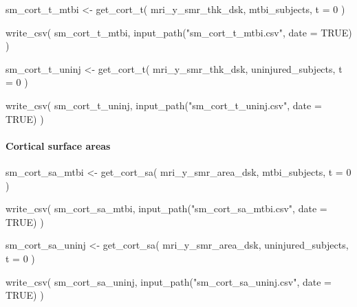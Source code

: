 \documentclass[
  letterpaper,
  DIV=11,
  numbers=noendperiod]{scrreprt}
\let\oldparagraph\paragraph
\renewcommand{\paragraph}[1]{\oldparagraph{#1}\mbox{}}
\newenvironment{Shaded}{\begin{snugshade}}{\end{snugshade}}
\newcommand{\AttributeTok}[1]{\textcolor[rgb]{0.40,0.45,0.13}{#1}}
\newcommand{\ConstantTok}[1]{\textcolor[rgb]{0.56,0.35,0.01}{#1}}
\newcommand{\DecValTok}[1]{\textcolor[rgb]{0.68,0.00,0.00}{#1}}
\newcommand{\FunctionTok}[1]{\textcolor[rgb]{0.28,0.35,0.67}{#1}}
\newcommand{\NormalTok}[1]{\textcolor[rgb]{0.00,0.23,0.31}{#1}}
\newcommand{\OtherTok}[1]{\textcolor[rgb]{0.00,0.23,0.31}{#1}}
\newcommand{\StringTok}[1]{\textcolor[rgb]{0.13,0.47,0.30}{#1}}
\begin{document}
\begin{Shaded}
\begin{Highlighting}[]
\NormalTok{sm\_cort\_t\_mtbi }\OtherTok{\textless{}{-}} \FunctionTok{get\_cort\_t}\NormalTok{(}
\NormalTok{    mri\_y\_smr\_thk\_dsk,}
\NormalTok{    mtbi\_subjects,}
    \AttributeTok{t =} \DecValTok{0}
\NormalTok{)}

\FunctionTok{write\_csv}\NormalTok{(}
\NormalTok{    sm\_cort\_t\_mtbi, }\FunctionTok{input\_path}\NormalTok{(}\StringTok{"sm\_cort\_t\_mtbi.csv"}\NormalTok{, }\AttributeTok{date =} \ConstantTok{TRUE}\NormalTok{)}
\NormalTok{)}

\NormalTok{sm\_cort\_t\_uninj }\OtherTok{\textless{}{-}} \FunctionTok{get\_cort\_t}\NormalTok{(}
\NormalTok{    mri\_y\_smr\_thk\_dsk,}
\NormalTok{    uninjured\_subjects,}
    \AttributeTok{t =} \DecValTok{0}
\NormalTok{)}

\FunctionTok{write\_csv}\NormalTok{(}
\NormalTok{    sm\_cort\_t\_uninj, }\FunctionTok{input\_path}\NormalTok{(}\StringTok{"sm\_cort\_t\_uninj.csv"}\NormalTok{, }\AttributeTok{date =} \ConstantTok{TRUE}\NormalTok{)}
\NormalTok{)}
\end{Highlighting}
\end{Shaded}

\paragraph{Cortical surface areas}\label{cortical-surface-areas}

\begin{Shaded}
\begin{Highlighting}[]
\NormalTok{sm\_cort\_sa\_mtbi }\OtherTok{\textless{}{-}} \FunctionTok{get\_cort\_sa}\NormalTok{(}
\NormalTok{    mri\_y\_smr\_area\_dsk, mtbi\_subjects, }\AttributeTok{t =} \DecValTok{0}
\NormalTok{)}

\FunctionTok{write\_csv}\NormalTok{(}
\NormalTok{    sm\_cort\_sa\_mtbi, }\FunctionTok{input\_path}\NormalTok{(}\StringTok{"sm\_cort\_sa\_mtbi.csv"}\NormalTok{, }\AttributeTok{date =} \ConstantTok{TRUE}\NormalTok{)}
\NormalTok{)}

\NormalTok{sm\_cort\_sa\_uninj }\OtherTok{\textless{}{-}} \FunctionTok{get\_cort\_sa}\NormalTok{(}
\NormalTok{    mri\_y\_smr\_area\_dsk, uninjured\_subjects, }\AttributeTok{t =} \DecValTok{0}
\NormalTok{)}

\FunctionTok{write\_csv}\NormalTok{(}
\NormalTok{    sm\_cort\_sa\_uninj, }\FunctionTok{input\_path}\NormalTok{(}\StringTok{"sm\_cort\_sa\_uninj.csv"}\NormalTok{, }\AttributeTok{date =} \ConstantTok{TRUE}\NormalTok{)}
\NormalTok{)}
\end{Highlighting}
\end{Shaded}
\end{document}
